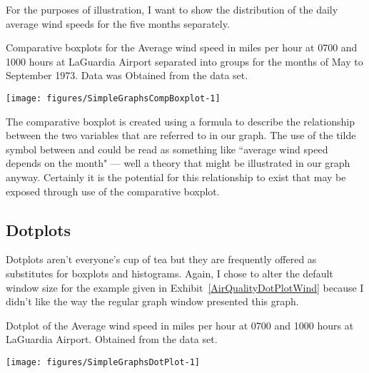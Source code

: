 For the purposes of illustration, I want to show the distribution of the daily average wind speeds for the five months separately.  
\begin{exhibit} 
\begin{center} 
\caption{Comparative boxplots for the Average wind speed in miles per hour at 0700 and 1000 hours at LaGuardia Airport separated into groups for the months of May to September 1973. Data was Obtained from the  data set.} 
\label{AirQualityCompBoxplotWindMonth} 
\begin{knitrout}
\color{fgcolor}\begin{kframe}
\begin{alltt}
\hlstd{> }\hlopt{~} \hlstd{=}\hlstd{,} \hlstd{=}\hlstd{)}
\end{alltt}
\end{kframe}
\texttt{[image: figures/SimpleGraphsCompBoxplot-1]} 

\end{knitrout}
\end{center} 
\end{exhibit} 
The comparative boxplot is created using a formula to describe the relationship between the two variables that are referred to in our graph. The use of the tilde symbol between  and  could be read as something like ``average wind speed depends on the month" --- well a theory that might be illustrated in our graph anyway. Certainly it is the potential for this relationship to exist that may be exposed through use of the comparative boxplot. 
 
\subsection{Dotplots} 
 
Dotplots aren't everyone's cup of tea but they are frequently offered as substitutes for boxplots and histograms. Again, I chose to alter the default window size for the example given in Exhibit~\ref{AirQualityDotPlotWind} 
because I didn't like the way the regular graph window presented this graph. 
\begin{exhibit} 
\begin{center} 
\caption{Dotplot of the Average wind speed in miles per hour at 0700 and 1000 hours at LaGuardia Airport. Obtained from the  data set.} 
\label{AirQualityDotPlotWind} 
\begin{knitrout}
\color{fgcolor}
\texttt{[image: figures/SimpleGraphsDotPlot-1]} 

\end{knitrout}
\end{center} 
\end{exhibit} 
 
